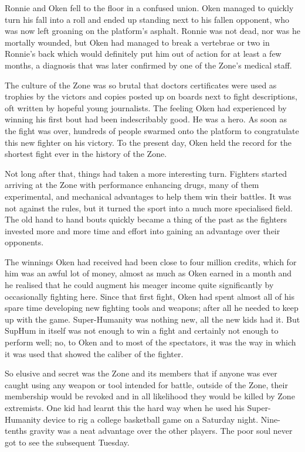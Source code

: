 Ronnie and Oken fell to the floor in a confused union. Oken managed to quickly turn his fall into a roll and ended up standing next to his fallen opponent, who was now left groaning on the platform's asphalt. Ronnie was not dead, nor was he mortally wounded, but Oken had managed to break a vertebrae or two in Ronnie's back which would definitely put him out of action for at least a few months, a diagnosis that was later confirmed by one of the Zone's medical staff.

The culture of the Zone was so brutal that doctors certificates were used as trophies by the victors and copies posted up on boards next to fight descriptions, oft written by hopeful young journalists. The feeling Oken had experienced by winning his first bout had been indescribably good. He was a hero. As soon as the fight was over, hundreds of people swarmed onto the platform to congratulate this new fighter on his victory. To the present day, Oken held the record for the shortest fight ever in the history of the Zone.

Not long after that, things had taken a more interesting turn. Fighters started arriving at the Zone with performance enhancing drugs, many of them experimental, and mechanical advantages to help them win their battles. It was not against the rules, but it turned the sport into a much more specialised field. The old hand to hand bouts quickly became a thing of the past as the fighters invested more and more time and effort into gaining an advantage over their opponents.

The winnings Oken had received had been close to four million credits, which for him was an awful lot of money, almost as much as Oken earned in a month and he realised that he could augment his meager income quite significantly by occasionally fighting here. Since that first fight, Oken had spent almost all of his spare time developing new fighting tools and weapons; after all he needed to keep up with the game. Super-Humanity was nothing new, all the new kids had it. But SupHum in itself was not enough to win a fight and certainly not enough to perform well; no, to Oken and to most of the spectators, it was the way in which it was used that showed the caliber of the fighter.

So elusive and secret was the Zone and its members that if anyone was ever caught using any weapon or tool intended for battle, outside of the Zone, their membership would be revoked and in all likelihood they would be killed by Zone extremists. One kid had learnt this the hard way when he used his Super-Humanity device to rig a college basketball game on a Saturday night. Nine-tenths gravity was a neat advantage over the other players. The poor soul never got to see the subsequent Tuesday.

